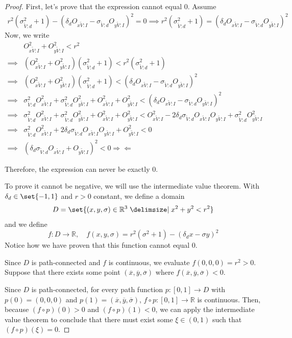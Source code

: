\documentclass[a4paper,12pt]{article}
\newcommand{\contradiction}{\Rightarrow\!\Leftarrow}
\newcommand{\HSview}[1][V]{\widetilde{#1}}
\newcommand{\HSOx}[1][I]{O_{x\HSview:#1}}
\newcommand{\HSOy}[1][I]{O_{y\HSview:#1}}
\newcommand{\HSdelta}[1][d]{\delta_{#1}}
\newcommand{\HSsigma}[1][d]{\sigma_{\HSview:#1}}
\theoremstyle{definition}
\theoremstyle{plain}
\begin{document}
	\begin{proof}
		First, let's prove that the expression cannot equal 0.
		Assume
		\begin{align*}
			r^2\left(\HSsigma^2 + 1\right) - \left(\HSdelta \HSOx - \HSsigma \HSOy\right)^2 = 0
			\implies r^2\left(\HSsigma^2 + 1\right) = \left(\HSdelta \HSOx - \HSsigma \HSOy\right)^2
		\end{align*}
		Now, we write
		{
			\setlength{\jot}{0.75em}
			\begin{align*}
			         	 & \HSOx^2 + \HSOy^2 < r^2\\
				\implies & \left(\HSOx^2 + \HSOy^2\right)\left(\HSsigma^2 + 1\right) < r^2\left(\HSsigma^2 + 1\right)\\
				\implies & \left(\HSOx^2 + \HSOy^2\right)\left(\HSsigma^2 + 1\right) < \left(\HSdelta \HSOx - \HSsigma \HSOy\right)^2\\
				\implies & \HSsigma^2\HSOx^2 + \HSsigma^2\HSOy^2 + \HSOx^2 + \HSOy^2 < \left(\HSdelta \HSOx - \HSsigma \HSOy\right)^2\\
				\implies & \HSsigma^2\HSOx^2 + \HSsigma^2\HSOy^2 + \HSOx^2 + \HSOy^2 < \HSOx^2 - 2\HSdelta\HSsigma\HSOx\HSOy  + \HSsigma^2 \HSOy^2\\
				\implies & \HSsigma^2\HSOx^2 + 2\HSdelta\HSsigma\HSOx\HSOy + \HSOy^2 < 0\\
				\implies & \left(\HSdelta\HSsigma\HSOx + \HSOy\right)^2 < 0 \contradiction
			\end{align*}
		}

		Therefore, the expression can never be exactly $0$.
		
		To prove it cannot be negative, we will use the intermediate value theorem.
		With $\HSdelta \in \set{-1, 1}$ and $r > 0$ constant,
		we define a domain
		$$D = \set{(x, y, \sigma) \in \mathbb{R}^3 \given x^2 + y^2 < r^2}$$
		and we define
		$$f : D \to \mathbb{R},\quad f(x, y, \sigma) = r^2\left(\sigma^2 + 1\right) - \left(\HSdelta x - \sigma y\right)^2$$
		Notice how we have proven that this function cannot equal $0$.

		Since $D$ is path-connected and $f$ is continuous, we evaluate $f\left(0, 0, 0\right) = r^2 > 0$.
		Suppose that there exists some point
		$\left(\overline{x}, \overline{y}, \overline{\sigma}\right)$ where
		$f\left(\overline{x}, \overline{y}, \overline{\sigma}\right) < 0$.

		Since $D$ is path-connected, for every path function $p : \left[0, 1\right] \to D$ with
		$p\left(0\right) = \left(0, 0, 0\right)$ and $p\left(1\right) = \left(\overline{x}, \overline{y}, \overline{\sigma}\right)$,
		$f \circ p : \left[0, 1\right] \to \mathbb{R}$ is continuous. Then, because
		$\left(f \circ p\right)\left(0\right) > 0$ and $\left(f \circ p\right)\left(1\right) < 0$,
		we can apply the intermediate value theorem to conclude
		that there must exist some $\xi \in \left(0, 1\right)$ such that $\left(f \circ p\right)\left(\xi\right) = 0$.


\end{proof}
\end{document}
